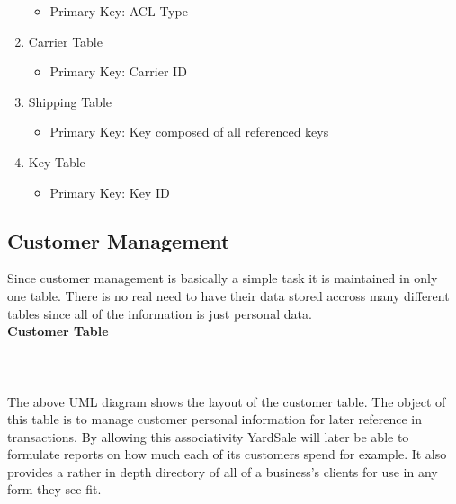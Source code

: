 \documentclass{report}
\begin{document}
\begin{enumerate}
\begin{itemize}
            \item{Primary Key: ACL Type}
        \end{itemize}
        \item{Carrier Table}
        \begin{itemize}
            \item{Primary Key: Carrier ID}
        \end{itemize}
        \item{Shipping Table}
        \begin{itemize}
            \item{Primary Key: Key composed of all referenced keys}
        \end{itemize}
        \item{Key Table}
        \begin{itemize}
            \item{Primary Key: Key ID}
        \end{itemize}
    \end{enumerate}

    \newpage

        \subsection{Customer Management}

        Since customer management is basically a simple task it is maintained in only
        one table. There is no real need to have their data stored accross many
        different tables since all of the information is just personal
        data.\\

        {\bf Customer Table}\\
        \\
        \\
        \\
        The above UML diagram shows the layout of the customer table. The object of this
        table is to manage customer personal information for later reference in
        transactions. By allowing this associativity YardSale will later be able to
        formulate reports on how much each of its customers spend for example. It also
        provides a rather in depth directory of all of a business's clients for use
        in any form they see fit.
\end{document}
